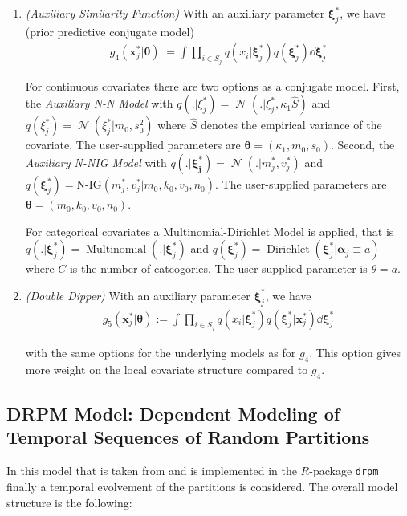 \documentclass[12pt,a4paper]{article}
\newcommand{\drpm}{\texttt{drpm}}
\DeclareMathOperator{\Normal}{\mathcal{N}}
\DeclareMathOperator{\Multinomial}{\mathrm{Multinomial}}
\DeclareMathOperator{\Dir}{\mathrm{Dirichlet}}
\begin{document}
\begin{enumerate}
    \item  \textit{(Auxiliary Similarity Function)} With an auxiliary parameter
    $\pmb{\xi}_j^*$, we have (prior predictive conjugate model)
    \begin{align*}
        g_4(\pmb{x}_j^* \vert \pmb{\theta}) := \int \prod_{i \in S_j} q(x_i \vert \pmb{\xi}^*_j) q(\pmb{\xi}^*_j) \dd \pmb{\xi}^*_j
    \end{align*}
    
    For continuous covariates there are two options as a conjugate model. First, the \textit{Auxiliary N-N Model} with $q(. \vert \xi_j^*) = \Normal (. \vert \xi_j^*, \kappa_1 \hat{S})$  and $q(\xi_j^*) = \Normal (\xi_j^* \vert m_0, s_0^2)$ where $\hat{S}$ denotes the empirical variance of the covariate. The user-supplied parameters are $\pmb{\theta} = ( \kappa_1, m_0, s_0).$ Second, the \textit{Auxiliary N-NIG Model} with $q (. \vert \pmb{\xi_j^*}) = \Normal(. \vert m_j^*, v_j^*)$ and $q(\pmb{\xi}_j^*) = \text{N-IG} (m_j^*, v_j^* \vert m_0, k_0, v_0, n_0)$. The user-supplied parameters are $\pmb{\theta} = (m_0, k_0,v_0, n_0)$. \medskip
    
    For categorical covariates a Multinomial-Dirichlet Model is applied, that is \newline $q(. \vert \pmb{\xi}_j^*) = \Multinomial ( . \vert \pmb{\xi}_j^* )$ and $q( \pmb{\xi}_j^*) = \Dir ( \pmb{\xi}_j^* \vert \pmb{\alpha}_j \equiv a )$ where $C$ is the number of cateogories. The user-supplied parameter is $\theta = a$. \medskip

    \item \textit{(Double Dipper)} With an auxiliary parameter
    $\pmb{\xi}_j^*$, we have
    \begin{align*}
        g_5(\pmb{x}_j^* \vert \pmb{\theta}) := \int \prod_{i \in S_j} q(x_i \vert \pmb{\xi}^*_j) q(\pmb{\xi}^*_j \vert \pmb{x}_j^*) \dd \pmb{\xi}^*_j
    \end{align*}

    with the same options for the underlying models as for $g_4$. This option gives more weight on the local covariate structure compared to $g_4$. 
\end{enumerate}

\subsection{DRPM Model: Dependent Modeling of Temporal Sequences of Random Partitions}

In this model that is taken from \cite{Page2021-Temporal} and is implemented in the $R$-package \drpm{} \cite{drpm} finally a temporal evolvement of the partitions is considered. The overall model structure is the following:
\end{document}
